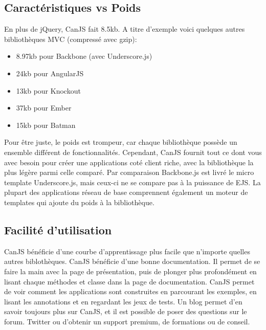 \subsection{Caractéristiques vs Poids}


En plus de jQuery, CanJS fait 8.5kb. A titre d’exemple voici quelques autres bibliothèques MVC (compressé avec gzip):

\begin{itemize}

	\item[\textbullet]
	8.97kb pour Backbone (avec Underscore.js)

	\item[\textbullet]
    24kb pour AngularJS

	\item[\textbullet] 
    13kb pour Knockout

	\item[\textbullet] 
    37kb pour Ember
    
    \item[\textbullet] 
    15kb pour Batman

\end{itemize}

Pour être juste, le poids est trompeur, car chaque bibliothèque possède un ensemble différent de fonctionnalités. Cependant, CanJS fournit tout ce dont vous avec besoin pour créer une applications coté client riche, avec la bibliothèque la plus légère parmi celle comparé.
Par comparaison Backbone.js est livré le micro template Underscore.js, mais ceux-ci ne se compare pas à la puissance de EJS. La plupart des applications réseau de base comprennent également un moteur de templates qui ajoute du poids à la bibliothèque. 

\subsection{Facilité d’utilisation}

CanJS bénéficie d’une courbe d’apprentissage plus facile que n’importe quelles autres biblothèques. CanJS bénéficie d’une bonne documentation. Il permet de se faire la main avec la page de présentation, puis de plonger plus profondément en lisant chaque méthodes et classe dans la page de documentation. CanJS permet de voir comment les applications sont construites en parcourant les exemples, en lisant les annotations et en regardant les jeux de tests. Un blog permet d’en savoir toujours plus sur CanJS, et il est possible de poser des questions sur le forum. Twitter ou d’obtenir un support premium, de formations ou de conseil.

